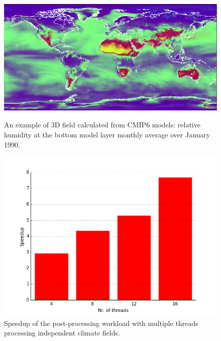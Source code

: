 \documentclass[procedia]{easychair}
\begin{document}
\begin{figure}[h]
\centering
\begin{minipage}[b]{.45\textwidth}
  \centering
   \vspace*{1.5cm}
 \includegraphics[width=1\textwidth]{hur.png}
 \caption{An example of 3D field calculated from CMIP6 models: relative humidity at the bottom model 
   layer monthly average over January 1990.}
\label{fig:hum}
\end{minipage}%
\hspace{0.6cm}
\begin{minipage}[b]{.45\textwidth}
  \centering
 \includegraphics[width=1\textwidth]{speedup_chart.png}
  \vspace*{-0.75cm}
 \caption{Speedup of the post-processing workload with multiple threads 
processing independent climate fields.}
\label{fig:speedup}
\end{minipage}
\end{figure}
\end{document}
